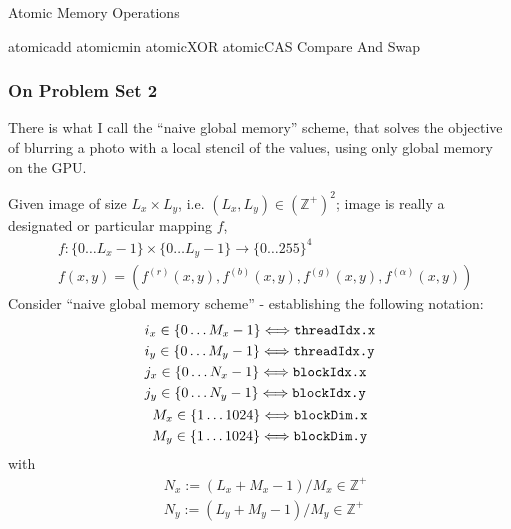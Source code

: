 \documentclass[10pt]{amsart}
\begin{document}
\begin{multicols*}{2}
Atomic Memory Operations

atomicadd atomicmin atomicXOR atomicCAS Compare And Swap


\subsubsection{On Problem Set 2}

There is what I call the ``naive global memory'' scheme, that solves the objective of blurring a photo with a local stencil of the values, using only global memory on the GPU.

Given image of size $L_x \times L_y$, i.e. $(L_x,L_y) \in (\mathbb{Z}^+)^2$; image is really a designated or particular mapping $f$,
\[
\begin{aligned}
  & f: \lbrace 0 \dots L_x - 1 \rbrace \times \lbrace 0 \dots L_y - 1 \rbrace \to \lbrace 0 \dots 255 \rbrace^4 \\ 
  & f(x,y) = (f^{(r)}(x,y) , f^{(b)}(x,y), f^{(g)}(x,y), f^{(\alpha)}(x,y) )
\end{aligned}
\]
Consider ``naive global memory scheme'' - establishing the following notation:
\[
\begin{gathered}
  \begin{aligned}
    & i_x \in \lbrace 0 \dots M_x - 1 \rbrace \Longleftrightarrow \verb|threadIdx.x| \\
    & i_y \in \lbrace 0 \dots M_y - 1 \rbrace \Longleftrightarrow \verb|threadIdx.y|  \\
    & j_x \in \lbrace 0 \dots N_x - 1 \rbrace \Longleftrightarrow \verb|blockIdx.x|  \\
    & j_y \in \lbrace 0 \dots N_y - 1 \rbrace \Longleftrightarrow \verb|blockIdx.y|  
  \end{aligned} \\
  \begin{aligned}
    & M_x \in \lbrace 1 \dots 1024 \rbrace \Longleftrightarrow \verb|blockDim.x| \\ 
    & M_y \in \lbrace 1 \dots 1024 \rbrace \Longleftrightarrow \verb|blockDim.y| 
    \end{aligned}
\end{gathered}
\]
with
\[
\begin{aligned}
  & N_x := (L_x + M_x - 1)/M_x \in \mathbb{Z}^+ \\ 
  & N_y := (L_y + M_y - 1)/M_y \in \mathbb{Z}^+ 
  \end{aligned}
\]


\end{multicols*}
\end{document}
